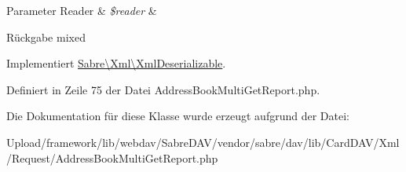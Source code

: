 \begin{DoxyParams}[1]{Parameter}
Reader & {\em \$reader} & \\
\hline
\end{DoxyParams}
\begin{DoxyReturn}{Rückgabe}
mixed 
\end{DoxyReturn}


Implementiert \mbox{\hyperlink{interface_sabre_1_1_xml_1_1_xml_deserializable_a19e0eca545b9a0d93f7d6b69085ade30}{Sabre\textbackslash{}\+Xml\textbackslash{}\+Xml\+Deserializable}}.



Definiert in Zeile 75 der Datei Address\+Book\+Multi\+Get\+Report.\+php.



Die Dokumentation für diese Klasse wurde erzeugt aufgrund der Datei\+:\begin{DoxyCompactItemize}
\item 
Upload/framework/lib/webdav/\+Sabre\+D\+A\+V/vendor/sabre/dav/lib/\+Card\+D\+A\+V/\+Xml/\+Request/Address\+Book\+Multi\+Get\+Report.\+php\end{DoxyCompactItemize}
